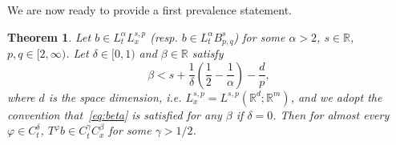 \documentclass[10pt]{article}
\newtheorem{theorem}{Theorem}
\begin{document}
We are now ready to provide a first prevalence statement.

\begin{theorem}
  \label{sec3.3 thm prevalence averaging}Let $b \in L^{\alpha}_t L^{s, p}_x$
  (resp. $b \in L^{\alpha}_t B^s_{p, q}$) for some $\alpha > 2$, $s \in
  \mathbb{R}$, $p, q \in [2, \infty)$. Let $\delta \in [0, 1)$ and $\beta \in
  \mathbb{R}$ satisfy
  \begin{equation}
    \beta < s + \frac{1}{\delta} \left( \frac{1}{2} - \frac{1}{\alpha} \right)
    - \frac{d}{p}, \label{eq:beta}
  \end{equation}
  where $d$ is the space dimension, i.e. $L^{s, p}_x = L^{s, p} (\mathbb{R}^d
  ; \mathbb{R}^m)$, and we adopt the convention that~{\eqref{eq:beta}} is
  satisfied for any $\beta$ if $\delta = 0$. Then for almost every $\varphi
  \in C^{\delta}_t$, $T^{\varphi} b \in C^{\gamma}_t C^{\beta}_x$ for some
  $\gamma > 1 / 2$.
\end{theorem}
\end{document}
